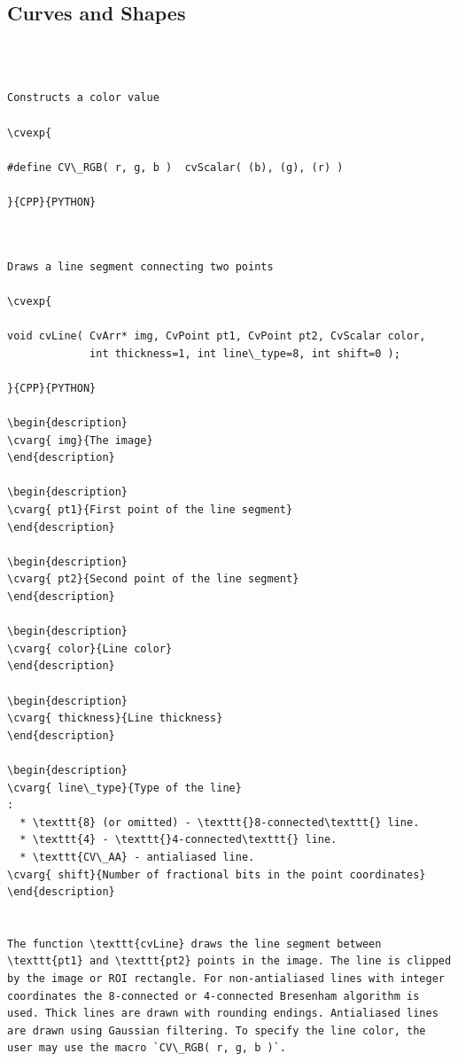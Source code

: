 \subsection{Curves and Shapes}
\begin{verbatim}


\end{verbatim}
\label{CV_RGB}
\begin{verbatim}

Constructs a color value

\cvexp{

#define CV\_RGB( r, g, b )  cvScalar( (b), (g), (r) )

}{CPP}{PYTHON}


\end{verbatim}
\label{Line}
\begin{verbatim}

Draws a line segment connecting two points

\cvexp{

void cvLine( CvArr* img, CvPoint pt1, CvPoint pt2, CvScalar color,
             int thickness=1, int line\_type=8, int shift=0 );

}{CPP}{PYTHON}

\begin{description}
\cvarg{ img}{The image}
\end{description}

\begin{description}
\cvarg{ pt1}{First point of the line segment}
\end{description}

\begin{description}
\cvarg{ pt2}{Second point of the line segment}
\end{description}

\begin{description}
\cvarg{ color}{Line color}
\end{description}

\begin{description}
\cvarg{ thickness}{Line thickness}
\end{description}

\begin{description}
\cvarg{ line\_type}{Type of the line}
:
  * \texttt{8} (or omitted) - \texttt{}8-connected\texttt{} line.
  * \texttt{4} - \texttt{}4-connected\texttt{} line.
  * \texttt{CV\_AA} - antialiased line.
\cvarg{ shift}{Number of fractional bits in the point coordinates}
\end{description}


The function \texttt{cvLine} draws the line segment between \texttt{pt1} and \texttt{pt2} points in the image. The line is clipped by the image or ROI rectangle. For non-antialiased lines with integer coordinates the 8-connected or 4-connected Bresenham algorithm is used. Thick lines are drawn with rounding endings. Antialiased lines are drawn using Gaussian filtering. To specify the line color, the user may use the macro `CV\_RGB( r, g, b )`.


\end{verbatim}
